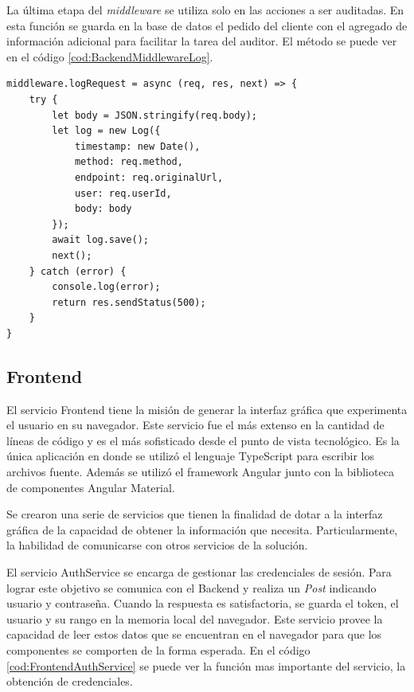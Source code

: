 La última etapa del \emph{middleware} se utiliza solo en las acciones a ser auditadas.
En esta función se guarda en la base de datos el pedido del cliente con el agregado de información adicional para facilitar la tarea del auditor. El método se puede ver en el código \ref{cod:BackendMiddlewareLog}.

\begin{lstlisting}[label=cod:BackendMiddlewareLog,caption=Persistencia de la operación]
middleware.logRequest = async (req, res, next) => {
    try {
        let body = JSON.stringify(req.body);
        let log = new Log({
            timestamp: new Date(),
            method: req.method,
            endpoint: req.originalUrl,
            user: req.userId,
            body: body
        });
        await log.save();
        next();
    } catch (error) {
        console.log(error);
        return res.sendStatus(500);
    }
}
\end{lstlisting}

\subsection{Frontend}

El servicio Frontend tiene la misión de generar la interfaz gráfica que experimenta el usuario en su navegador.
Este servicio fue el más extenso en la cantidad de líneas de código y es el más sofisticado desde el punto de vista tecnológico.
Es la única aplicación en donde se utilizó el lenguaje TypeScript para escribir los archivos fuente.
Además se utilizó el framework Angular junto con la biblioteca de componentes Angular Material.

Se crearon una serie de servicios que tienen la finalidad de dotar a la interfaz gráfica de la capacidad de obtener la información que necesita.
Particularmente, la habilidad de comunicarse con otros servicios de la solución.

El servicio AuthService se encarga de gestionar las credenciales de sesión.
Para lograr este objetivo se comunica con el Backend y realiza un \emph{Post} indicando usuario y contraseña.
Cuando la respuesta es satisfactoria, se guarda el token, el usuario y su rango en la memoria local del navegador.
Este servicio provee la capacidad de leer estos datos que se encuentran en el navegador para que los componentes se comporten de la forma esperada.
En el código \ref{cod:FrontendAuthService} se puede ver la función mas importante del servicio, la obtención de credenciales.

